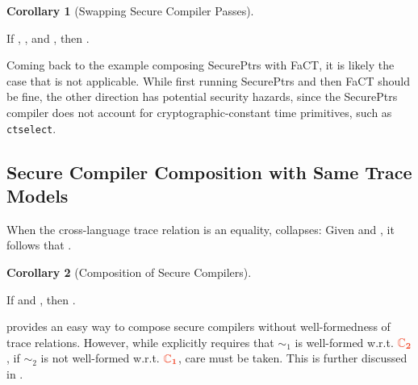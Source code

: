 \documentclass[acmsmall]{acmart}
\theoremstyle{definition}
\newtheorem{corollary}{Corollary}[section]
\begin{document}
\begin{corollary}[Swapping Secure Compiler Passes]\label{corr:swappable}
  $\;$ 

  If , %
  , %
  and ,
  then . \Coqed
\end{corollary}

Coming back to the example composing SecurePtrs with FaCT, it is likely the case that  is not applicable.
While first running SecurePtrs and then FaCT should be fine, the other direction has potential security hazards, since the SecurePtrs compiler does not account for cryptographic-constant time primitives, such as \texttt{ctselect}.

\subsection{Secure Compiler Composition with Same Trace Models}
When the cross-language trace relation is an equality,  collapses:
Given  and , it follows that .

\begin{corollary}[Composition of Secure Compilers]\label{corr:rtp}
  $\;$ 

  If  and , then . \Coqed
\end{corollary}

 provides an easy way to compose secure compilers without well-formedness of trace relations. 
% 
However, while  explicitly requires that $\sim_1$ is well-formed w.r.t. $\trg{\class[_2]}$, if $\sim_2$ is not well-formed w.r.t. $\trg{\class[_1]}$, care must be taken. 
This is further discussed in .
\end{document}
